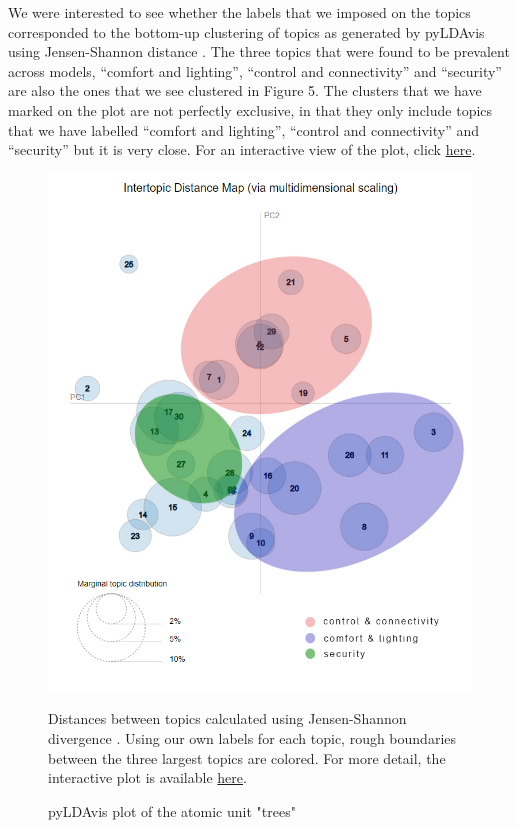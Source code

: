 \documentclass{article}
\begin{document}
    We were interested to see whether the labels that we imposed on the topics corresponded to the bottom-up clustering of topics as generated by pyLDAvis using Jensen-Shannon distance \cite{sievert2014ldavis}. The three topics that were found to be prevalent across models, “comfort and lighting”, “control and connectivity” and “security” are also the ones that we see clustered in Figure 5. The clusters that we have marked on the plot are not perfectly exclusive, in that they only include topics that we have labelled “comfort and lighting”, “control and connectivity” and “security” but it is very close. For an interactive view of the plot, click \href{https://tinyurl.com/y9ncgo5b}{here}.
    
    \begin{figure}[H]
        \begin{centering}
        \includegraphics[scale=0.4]{../Figure/pyLDAvis_edit.jpg}
        \caption{pyLDAvis plot of the atomic unit "trees"}
        \end{centering}
        \begin{footnotesize} 
            Distances between topics calculated using Jensen-Shannon divergence \cite{sievert2014ldavis}. Using our own labels for each topic, rough boundaries between the three largest topics are colored. For more detail, the interactive plot is available \href{https://tinyurl.com/y9ncgo5b}{here}.
        \end{footnotesize}
    \end{figure}
    
\end{document}
